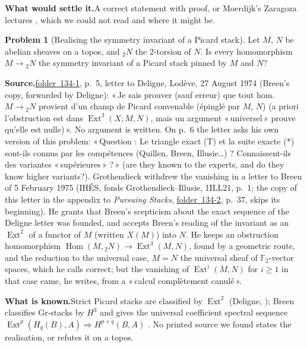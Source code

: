 \documentclass[11pt]{article}
\newcommand{\q}[1]{«\,#1\,»}
\newcommand{\fac}[1]{\href{https://grothendieck.umontpellier.fr/#1.pdf}{folder~#1}}
\newcommand{\Ext}{\operatorname{Ext}}
\theoremstyle{definition}
\newtheorem{problem}{Problem}
\theoremstyle{plain}\newtheorem*{proposition}{Proposition}\theoremstyle{definition}
\newcommand{\entry}[1]{\par\medskip\noindent\textbf{#1}\enspace}
\newcommand{\src}[1]{\entry{Source.}#1}
\newcommand{\known}{\entry{What is known.}}
\newcommand{\settle}{\entry{What would settle it.}}
\begin{document}
\settle A correct statement with proof, or Moerdijk's Zaragoza lectures \cite{moerdijk1993}, which we could not read and where it might be.

\begin{problem}[Realising the symmetry invariant of a Picard stack]\label{p:pic}
Let $M$, $N$ be abelian sheaves on a topos, and ${}_2N$ the $2$-torsion of $N$. Is every homomorphism $M \to {}_2N$ the symmetry invariant of a Picard stack pinned by $M$ and $N$?
\end{problem}

\src{\fac{134-1}, p.~5, letter to Deligne, Lodève, 27 August 1974 (Breen's copy, forwarded by Deligne): \q{Je sais prouver (sauf erreur) que tout hom.\ $M \to {}_2N$ provient d'un champ de Picard convenable (épinglé par $M$, $N$) (a priori l'obstruction est dans $\Ext^3(X; M, N)$, mais un argument \q{universel} prouve qu'elle est nulle)}. No argument is written. On p.~6 the letter asks his own version of this problem: \q{Question : Le triangle exact (T) et la suite exacte (*) sont-ils connus par les compétences (Quillen, Breen, Illusie\dots) ? Connaissent-ils des variantes \q{supérieures} ?} (are they known to the experts, and do they know higher variants?). Grothendieck withdrew the vanishing in a letter to Breen of 5 February 1975 (IHÉS, fonds Grothendieck--Illusie, 1ILL21, p.~1; the copy of this letter in the appendix to \emph{Pursuing Stacks}, \fac{134-2}, p.~37, skips its beginning). He grants that Breen's scepticism about the exact sequence of the Deligne letter was founded, and accepts Breen's reading of the invariant as an $\Ext^2$ of a functor of $M$ (written $X(M)$) into $N$. He keeps an obstruction homomorphism $\operatorname{Hom}(M, {}_2N) \to \Ext^3(M, N)$, found by a geometric route, and the reduction to the universal case, $M = N$ the universal sheaf of $\mathbb F_2$-vector spaces, which he calls correct; but the vanishing of $\Ext^i(M, N)$ for $i \ge 1$ in that case came, he writes, from a \q{calcul complètement canulé}.}

\known Strict Picard stacks are classified by $\Ext^2$ (Deligne, \cite[XVIII, 1.4]{sga4}); Breen classifies Gr-stacks by $H^3$ and gives the universal coefficient spectral sequence $\Ext^p(H_q(B), A) \Rightarrow H^{p+q}(B, A)$ \cite[\S6]{breen1999}. No printed source we found states the realisation, or refutes it on a topos.
\end{document}
